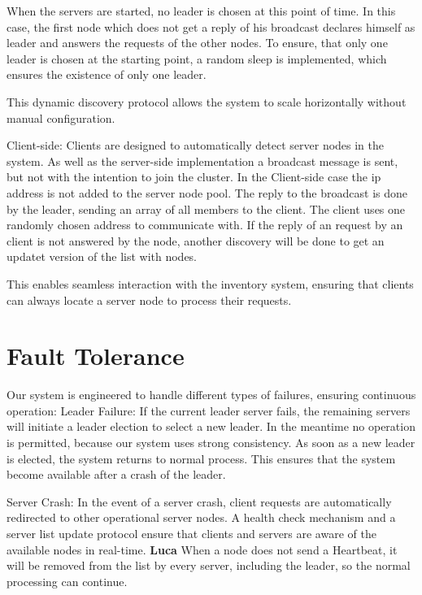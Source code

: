 When the servers are started, no leader is chosen at this point of time. In this case, the first node which does not get a reply of his broadcast declares himself as leader and answers the requests of the other nodes.
To ensure, that only one leader is chosen at the starting point, a random sleep is implemented, which ensures the existence of only one leader.

This dynamic discovery protocol allows the system to scale horizontally without manual configuration.

Client-side: Clients are designed to automatically detect server nodes in the system. As well as the server-side implementation a broadcast message is sent, but not with the intention
to join the cluster. In the Client-side case the ip address is not added to the server node pool. The reply to the broadcast is done by the leader, sending an array of all members to the client. 
The client uses one randomly chosen address to communicate with. If the reply of an request by an client is not answered by the node, another discovery will be done to get an updatet version of the list with nodes.

This enables seamless interaction with the inventory system, ensuring that clients can always locate a server node to process their requests.

\section{Fault Tolerance}\label{sec:FaultTolerance}
Our system is engineered to handle different types of failures, ensuring continuous operation:
Leader Failure: If the current leader server fails, the remaining servers will initiate a leader election to select a new leader. In the meantime no operation is permitted, because our system uses strong consistency. As soon as a new leader is elected, the system returns to normal process.
This ensures that the system become available after a crash of the leader.

Server Crash: In the event of a server crash, client requests are automatically redirected to other operational server nodes. A health check mechanism and a server list update protocol ensure that clients and servers are aware of the available nodes in real-time. \textbf{Luca} When a node does not send a Heartbeat,
it will be removed from the list by every server, including the leader, so the normal processing can continue.


